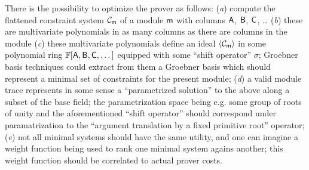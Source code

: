 There is the possibility to optimize the prover as follows:
(\emph{a})
compute the flattened constraint system $\mathcal{C}_{\textsf{m}}$ of a module $\textsf{m}$ with columns $\textsf{A}$, $\textsf{B}$, $\textsf{C}$, \dots{}
(\emph{b})
these are multivariate polynomials in as many columns as there are columns in the module
(\emph{c})
these multivariate polynomials define an ideal $\langle\mathcal{C}_{\textsf{m}}\rangle$ in some polynomial ring $\mathbb{F}[\textsf{A}, \textsf{B}, \textsf{C}, \dots]$ equipped with some ``shift operator'' $\sigma$; Groebner basis techniques could extract from them a Groebner basis which should represent a minimal set of constraints for the present module;
(\emph{d})
a valid module trace represents in some sense a ``parametrized solution'' to the above along a subset of the base field; the parametrization space being e.g. some group of roots of unity and the aforementioned ``shift operator'' should correspond under paramatrization to the ``argument translation by a fixed primitive root'' operator; 
(\emph{e})
not all minimal systems should have the same utility, and one can imagine a weight function being used to rank one minimal system agains another; this weight function should be correlated to actual prover costs.
